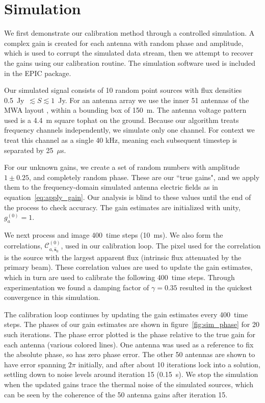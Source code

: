 \documentclass[a4paper,fleqn,usenatbib]{../mnras}
\newcommand{\spix}{\ensuremath{\hat{\mathbf{s}}_{0}}}
\newcommand{\Cna}[1][n]{\ensuremath{\mathcal{C}^{(#1)}_{a,\spix}}}
\newcommand{\caliter}{400}
\newcommand{\damp}{\ensuremath{\gamma}}
\begin{document}
\section{Simulation}\label{sec:sim}
We first demonstrate our calibration method through a controlled simulation. A complex gain is created for each antenna with random phase and amplitude, which is used to corrupt the simulated data stream, then we attempt to recover the gains using our calibration routine. The simulation software used is included in the EPIC package.

Our simulated signal consists of 10 random point sources with flux densities 0.5~Jy~$\lesssim S \lesssim 1$~Jy. For an antenna array we use the inner 51 antennas of the MWA layout \citep{bea12}, within a bounding box of 150~m. The antenna voltage pattern used is a 4.4~m square tophat on the ground. Because our algorithm treats frequency channels independently, we simulate only one channel. For context we treat this channel as a single 40 kHz, meaning each subsequent timestep is separated by 25~$\mu$s.

For our unknown gains, we create a set of random numbers with amplitude $1\pm0.25$, and completely random phase. These are our ``true gains", and we apply them to the frequency-domain simulated antenna electric fields as in equation~\ref{eq:apply_gain}. Our analysis is blind to these values until the end of the process to check accuracy. The gain estimates are initialized with unity, $g^{(0)}_a=1$.

We next process and image \caliter~time steps (10~ms). We also form the correlations, \Cna[0], used in our calibration loop. The pixel used for the correlation is the source with the largest apparent flux (intrinsic flux attenuated by the primary beam). These correlation values are used to update the gain estimates, which in turn are used to calibrate the following \caliter~time steps. Through experimentation we found a damping factor of $\damp=0.35$ resulted in the quickest convergence in this simulation.

The calibration loop continues by updating the gain estimates every \caliter~time steps. The phases of our gain estimates are shown in figure~\ref{fig:sim_phase} for 20 such iterations. The phase error plotted is the phase relative to the true gain for each antenna (various colored lines). One antenna was used as a reference to fix the absolute phase, so has zero phase error. The other 50 antennas are shown to have error spanning $2\pi$ initially, and after about 10 iterations lock into a solution, settling down to noise levels around iteration 15 (0.15~s). We stop the simulation when the updated gains trace the thermal noise of the simulated sources, which can be seen by the coherence of the 50 antenna gains after iteration 15.
\end{document}

